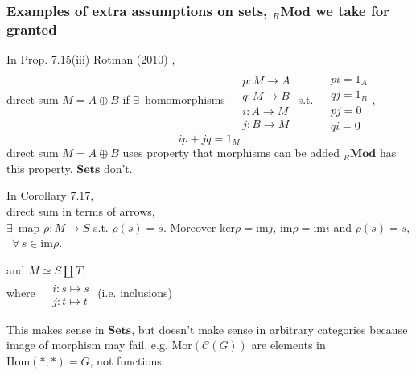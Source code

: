 \documentclass[10pt]{amsart}
\begin{document}
\begin{multicols*}{2}
\subsubsection{Examples of extra assumptions on sets, ${}_R\textbf{Mod}$ we take for granted}

In Prop. 7.15(iii) Rotman (2010) \cite{JRotman2010}, \\
direct sum $M=A\oplus B$ if $\exists \, $ homomorphisms $\begin{aligned} & \quad \\
& p:M\to A \\
& q:M\to B \\
& i:A\to M \\
& j:B\to M \end{aligned}$ s.t. $\begin{aligned} & \quad \\
& pi = 1_A \\
& qj = 1_B \\ 
& pj = 0 \\ & qi = 0 \end{aligned}$, 
\[
ip + jq = 1_M
\]
direct sum $M = A\oplus B$ uses property that morphisms can be added ${}_R\textbf{Mod}$ has this property. $\textbf{Sets}$ don't.  

In Corollary 7.17, \\
direct sum in terms of arrows, \\
$\exists \, $ map $\rho:M \to S$ s.t. $\rho(s)=s$.  Moreover $\text{ker}\rho = \text{im}j$, $\text{im}\rho = \text{im}i$ and $\rho(s)=s$, \, $\forall \, s \in \text{im}\rho$.  

and $M\simeq S \coprod T$, \\
where $\begin{aligned} & \quad \\
& i: s \mapsto s \\ 
& j : t \mapsto t \end{aligned}$ (i.e. inclusions)

This makes sense in $\textbf{Sets}$, but doesn't make sense in arbitrary categories because image of morphism may fail, e.g. $\text{Mor}(\mathcal{C}(G))$ are elements in $\text{Hom}(*,*) =G$, not functions.  


\end{multicols*}
\end{document}
